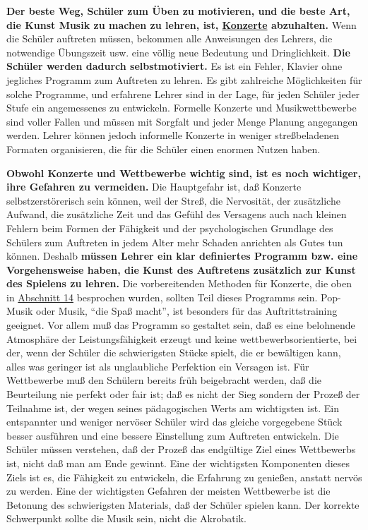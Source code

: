 \textbf{Der beste Weg, Schüler zum Üben zu motivieren, und die beste Art, die Kunst Musik zu machen zu lehren, ist, \hyperlink{c1iii14}{Konzerte} abzuhalten.}
Wenn die Schüler auftreten müssen, bekommen alle Anweisungen des Lehrers, die notwendige Übungszeit usw. eine völlig neue Bedeutung und Dringlichkeit.
\textbf{Die Schüler werden dadurch selbstmotiviert.}
Es ist ein Fehler, Klavier ohne jegliches Programm zum Auftreten zu lehren.
Es gibt zahlreiche Möglichkeiten für solche Programme, und erfahrene Lehrer sind in der Lage, für jeden Schüler jeder Stufe ein angemessenes zu entwickeln.
Formelle Konzerte und Musikwettbewerbe sind voller Fallen und müssen mit Sorgfalt und jeder Menge Planung angegangen werden.
Lehrer können jedoch informelle Konzerte in weniger streßbeladenen Formaten organisieren, die für die Schüler einen enormen Nutzen haben.

\textbf{Obwohl Konzerte und Wettbewerbe wichtig sind, ist es noch wichtiger, ihre Gefahren zu vermeiden.}
Die Hauptgefahr ist, daß Konzerte selbstzerstörerisch sein können, weil der Streß, die Nervosität, der zusätzliche Aufwand, die zusätzliche Zeit und das Gefühl des Versagens auch nach kleinen Fehlern beim Formen der Fähigkeit und der psychologischen Grundlage des Schülers zum Auftreten in jedem Alter mehr Schaden anrichten als Gutes tun können.
Deshalb \textbf{müssen Lehrer ein klar definiertes Programm bzw. eine Vorgehensweise haben, die Kunst des Auftretens zusätzlich zur Kunst des Spielens zu lehren.}
Die vorbereitenden Methoden für Konzerte, die oben in \hyperlink{c1iii14}{Abschnitt 14} besprochen wurden, sollten Teil dieses Programms sein.
Pop-Musik oder Musik, \enquote{die Spaß macht}, ist besonders für das Auftrittstraining geeignet.
Vor allem muß das Programm so gestaltet sein, daß es eine belohnende Atmosphäre der Leistungsfähigkeit erzeugt und keine wettbewerbsorientierte, bei der, wenn der Schüler die schwierigsten Stücke spielt, die er bewältigen kann, alles was geringer ist als unglaubliche Perfektion ein Versagen ist.
Für Wettbewerbe muß den Schülern bereits früh beigebracht werden, daß die Beurteilung nie perfekt oder fair ist; daß es nicht der Sieg sondern der Prozeß der Teilnahme ist, der wegen seines pädagogischen Werts am wichtigsten ist.
Ein entspannter und weniger nervöser Schüler wird das gleiche vorgegebene Stück besser ausführen und eine bessere Einstellung zum Auftreten entwickeln.
Die Schüler müssen verstehen, daß der Prozeß das endgültige Ziel eines Wettbewerbs ist, nicht daß man am Ende gewinnt.
Eine der wichtigsten Komponenten dieses Ziels ist es, die Fähigkeit zu entwickeln, die Erfahrung zu genießen, anstatt nervös zu werden.
Eine der wichtigsten Gefahren der meisten Wettbewerbe ist die Betonung des schwierigsten Materials, daß der Schüler spielen kann.
Der korrekte Schwerpunkt sollte die Musik sein, nicht die Akrobatik.

